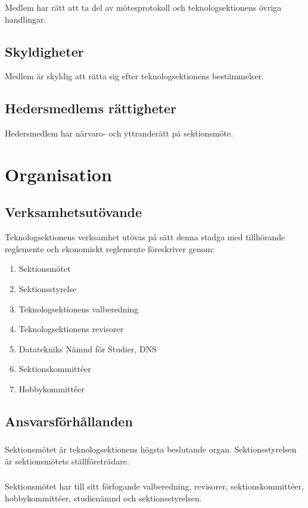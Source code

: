 \documentclass[a4paper]{dtek}
\begin{document}
\subsubsection{}
Medlem har rätt att ta del av mötesprotokoll och teknologsektionens övriga handlingar.
\subsection{Skyldigheter}
Medlem är skyldig att rätta sig efter teknologsektionens bestämmelser.
\subsection{Hedersmedlems rättigheter}
Hedersmedlem har närvaro- och yttranderätt på sektionsmöte.
\newpage

\section{Organisation}
\subsection{Verksamhetsutövande}
Teknologsektionens verksamhet utövas på sätt denna stadga med tillhörande reglemente och ekonomiskt reglemente föreskriver genom:
\begin{enumerate}
\item Sektionsmötet
\item Sektionsstyrelse
\item Teknologsektionens valberedning
\item Teknologsektionens revisorer
\item Datatekniks Nämnd för Studier, DNS
\item Sektionskommittéer
\item Hobbykommittéer
\end{enumerate}
\subsection{Ansvarsförhållanden}
\subsubsection{}
Sektionsmötet är teknologsektionens högsta beslutande organ. Sektionsstyrelsen är sektionsmötets ställföreträdare.
\subsubsection{}
Sektionsmötet har till sitt förfogande valberedning, revisorer, sektionskommittéer, hobbykommittéer, studienämnd och sektionsstyrelsen.
\newpage
\end{document}
